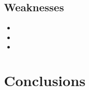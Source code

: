 \documentclass[12pt,a4paper,titlepage]{article}
\begin{document}
\subsection*{Weaknesses}
\label{sec:weaknesses}

\begin{itemize}
    \item
    \item
    \item
\end{itemize}

\section{Conclusions}
\label{sec:conclusions}

\begin{thebibliography}{99}

\bibitem{}

\end{thebibliography}

\label{LastPage}
\end{document}
